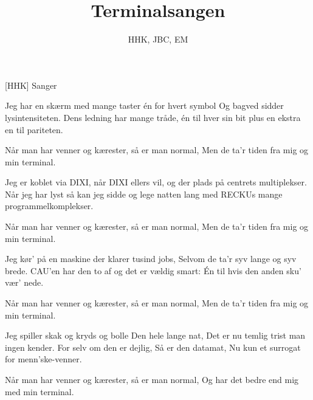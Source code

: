 \documentclass[a4paper,11pt]{article}
\title{Terminalsangen}
\author{HHK, JBC, EM}
\begin{document}
\maketitle

\begin{roles}
[HHK] Sanger
\end{roles}

\begin{song}
  Jeg har en skærm med mange taster
  én for hvert symbol
  Og bagved sidder lysintensiteten.
  Dens ledning har mange tråde,
  én til hver sin bit
  plus en ekstra en til pariteten.

  Når man har venner og kærester, så er man normal,
  Men de ta'r tiden fra mig og min terminal.

  Jeg er koblet via DIXI,
  når DIXI ellers vil,
  og der plads på centrets multiplekser.
  Når jeg har lyst så kan jeg sidde
  og lege natten lang
  med RECKUs mange programmelkomplekser.

  Når man har venner og kærester, så er man normal,
  Men de ta'r tiden fra mig og min terminal.

  Jeg kør' på en maskine
  der klarer tusind jobs,
  Selvom de ta'r syv lange og syv brede.
  CAU'en har den to af
  og det er vældig smart:
  Én til hvis den anden sku' vær' nede.

  Når man har venner og kærester, så er man normal,
  Men de ta'r tiden fra mig og min terminal.

  Jeg spiller skak og kryds og bolle
  Den hele lange nat,
  Det er nu temlig trist man ingen kender.
  For selv om den er dejlig,
  Så er den datamat,
  Nu kun et surrogat for menn'ske-venner.

  Når man har venner og kærester, så er man normal,
  Og har det bedre end mig med min terminal.
\end{song}
\end{document}
